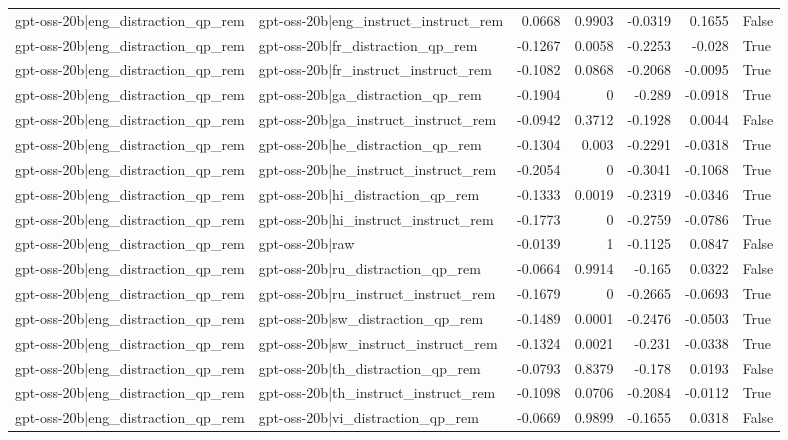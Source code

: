 \begin{table}
\begin{tabular}{l l r r r r l}
gpt-oss-20b|eng_distraction_qp_rem & gpt-oss-20b|eng_instruct_instruct_rem & 0.0668 & 0.9903 & -0.0319 & 0.1655 & False \\
gpt-oss-20b|eng_distraction_qp_rem & gpt-oss-20b|fr_distraction_qp_rem & -0.1267 & 0.0058 & -0.2253 & -0.028 & True \\
gpt-oss-20b|eng_distraction_qp_rem & gpt-oss-20b|fr_instruct_instruct_rem & -0.1082 & 0.0868 & -0.2068 & -0.0095 & True \\
gpt-oss-20b|eng_distraction_qp_rem & gpt-oss-20b|ga_distraction_qp_rem & -0.1904 & 0 & -0.289 & -0.0918 & True \\
gpt-oss-20b|eng_distraction_qp_rem & gpt-oss-20b|ga_instruct_instruct_rem & -0.0942 & 0.3712 & -0.1928 & 0.0044 & False \\
gpt-oss-20b|eng_distraction_qp_rem & gpt-oss-20b|he_distraction_qp_rem & -0.1304 & 0.003 & -0.2291 & -0.0318 & True \\
gpt-oss-20b|eng_distraction_qp_rem & gpt-oss-20b|he_instruct_instruct_rem & -0.2054 & 0 & -0.3041 & -0.1068 & True \\
gpt-oss-20b|eng_distraction_qp_rem & gpt-oss-20b|hi_distraction_qp_rem & -0.1333 & 0.0019 & -0.2319 & -0.0346 & True \\
gpt-oss-20b|eng_distraction_qp_rem & gpt-oss-20b|hi_instruct_instruct_rem & -0.1773 & 0 & -0.2759 & -0.0786 & True \\
gpt-oss-20b|eng_distraction_qp_rem & gpt-oss-20b|raw & -0.0139 & 1 & -0.1125 & 0.0847 & False \\
gpt-oss-20b|eng_distraction_qp_rem & gpt-oss-20b|ru_distraction_qp_rem & -0.0664 & 0.9914 & -0.165 & 0.0322 & False \\
gpt-oss-20b|eng_distraction_qp_rem & gpt-oss-20b|ru_instruct_instruct_rem & -0.1679 & 0 & -0.2665 & -0.0693 & True \\
gpt-oss-20b|eng_distraction_qp_rem & gpt-oss-20b|sw_distraction_qp_rem & -0.1489 & 0.0001 & -0.2476 & -0.0503 & True \\
gpt-oss-20b|eng_distraction_qp_rem & gpt-oss-20b|sw_instruct_instruct_rem & -0.1324 & 0.0021 & -0.231 & -0.0338 & True \\
gpt-oss-20b|eng_distraction_qp_rem & gpt-oss-20b|th_distraction_qp_rem & -0.0793 & 0.8379 & -0.178 & 0.0193 & False \\
gpt-oss-20b|eng_distraction_qp_rem & gpt-oss-20b|th_instruct_instruct_rem & -0.1098 & 0.0706 & -0.2084 & -0.0112 & True \\
gpt-oss-20b|eng_distraction_qp_rem & gpt-oss-20b|vi_distraction_qp_rem & -0.0669 & 0.9899 & -0.1655 & 0.0318 & False \\

\end{tabular}
\end{table}
